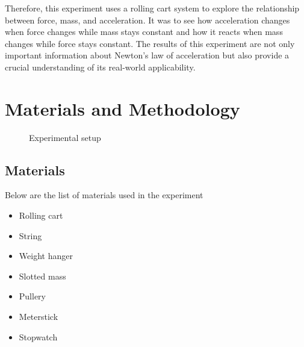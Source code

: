 \documentclass[a4paper,12pt]{article}
\begin{document}
Therefore, this experiment uses a rolling cart system to explore the relationship between force, mass, and acceleration. It was to see how acceleration changes when force changes while mass stays constant and how it reacts when mass changes while force stays constant. The results of this experiment are not only important information about Newton's law of acceleration but also provide a crucial understanding of its real-world applicability.

\section{Materials and Methodology}

\begin{figure}[h]
    \centering
    \caption{Experimental setup}
    \label{fig:cart_pulley}
\end{figure}

\subsection{Materials}
Below are the list of materials used in the experiment
\begin{itemize}
    \item Rolling cart
    \item String
    \item Weight hanger
    \item Slotted mass
    \item Pullery
    \item Meterstick
    \item Stopwatch
\end{itemize}
\end{document}
